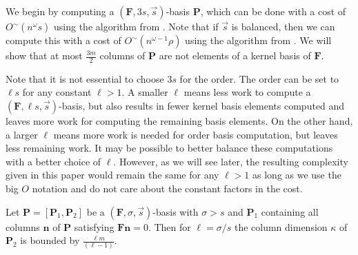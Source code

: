 We begin by computing a $\left(\mathbf{F},3s,\vec{s}\right)$-basis
$\mathbf{P}$, which can be done with a cost of $O^{\sim}\left(n^{\omega}s\right)$
using the algorithm from \citet{Giorgi2003}. Note that if $\vec{s}$
is balanced, then we can compute this with a cost of $O^{\sim}\left(n^{\omega-1}\rho\right)$
using the algorithm from . We will show
that at most %
$\frac{3m}{2}$ columns of \textbf{$\mathbf{P}$} are not elements
of a kernel basis of $\mathbf{F}$. 
\begin{rem}
Note that it is not essential to choose $3s$ for the order. The order
can be set to $\ell s$ for any constant $\ell>1$. A smaller $\ell$
means less work to compute a $(\mathbf{F},\ell s,\vec{s})$-basis,
but also results in fewer kernel basis elements computed and leaves
more work for computing the remaining basis elements. On the other
hand, a larger $\ell$ means more work is needed for order basis computation,
but leaves less remaining work. It may be possible to better balance
these computations with a better choice of $\ell$. However, as we
will see later, the resulting complexity given in this paper would
remain the same for any $\ell>1$ as long as we use the big $O$ notation
and do not care about the constant factors in the cost. \end{rem}
\begin{thm}
\label{thm:dimensionOfPartialNullspaceBasisBasedOnOrder} Let $\mathbf{P}=[\mathbf{P}_{1},\mathbf{P}_{2}]$
be a $(\mathbf{F},\sigma,\vec{s})$-basis with $\sigma>s$ and $\mathbf{P}_{1}$
containing all columns $\mathbf{n}$ of $\mathbf{P}$ satisfying $\mathbf{F}\mathbf{n}=0$.
Then for $\ell=\sigma/s$ the column dimension $\kappa$ of $\mathbf{P}_{2}$
is bounded by $\frac{\ell m}{(\ell-1)}.$ \end{thm}
